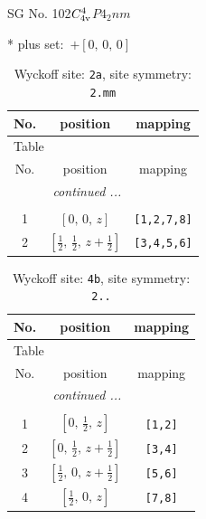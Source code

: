 \documentclass[fleqn,8pt]{jsarticle}
\begin{document}
\setcounter{MaxMatrixCols}{32}

\renewcommand{\tablename}{Table~}
\renewcommand{\figurename}{Figure~}
\begin{center}
\LARGE
SG No. 102\quad$C_{\rm 4v}^{4}$\quad$P4_2nm$\quad[ tetragonal ]
\end{center}
* plus set:\,\,\,$+\left[ 0,\, 0,\, 0 \right]$
\renewcommand{\arraystretch}{1.2}
\begin{longtable}{ccc}
\caption{Wyckoff site: {\tt 2a}, site symmetry: {\tt 2.mm}}
 \\
 \hline \hline
No. & position & mapping \\ \hline \endfirsthead

\multicolumn{2}{l}{\tablename\ \thetable{}} \\
 \hline \hline
No. & position & mapping \\ \hline \endhead

 \hline \hline
\multicolumn{2}{r}{\footnotesize\it continued ...} \\ \endfoot

 \hline \hline
\multicolumn{2}{r}{} \\ \endlastfoot

1 & $\left[ 0,\, 0,\, z \right]$ & {\tt [1,2,7,8]} \\ \hline
2 & $\left[ \frac{1}{2},\, \frac{1}{2},\, z + \frac{1}{2} \right]$ & {\tt [3,4,5,6]} \\
\end{longtable}
\renewcommand{\arraystretch}{1.2}
\begin{longtable}{ccc}
\caption{Wyckoff site: {\tt 4b}, site symmetry: {\tt 2..}}
 \\
 \hline \hline
No. & position & mapping \\ \hline \endfirsthead

\multicolumn{2}{l}{\tablename\ \thetable{}} \\
 \hline \hline
No. & position & mapping \\ \hline \endhead

 \hline \hline
\multicolumn{2}{r}{\footnotesize\it continued ...} \\ \endfoot

 \hline \hline
\multicolumn{2}{r}{} \\ \endlastfoot

1 & $\left[ 0,\, \frac{1}{2},\, z \right]$ & {\tt [1,2]} \\ \hline
2 & $\left[ 0,\, \frac{1}{2},\, z + \frac{1}{2} \right]$ & {\tt [3,4]} \\ \hline
3 & $\left[ \frac{1}{2},\, 0,\, z + \frac{1}{2} \right]$ & {\tt [5,6]} \\ \hline
4 & $\left[ \frac{1}{2},\, 0,\, z \right]$ & {\tt [7,8]} \\
\end{longtable}
\end{document}
